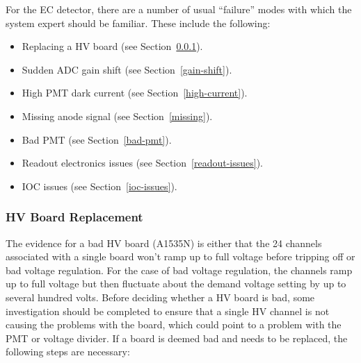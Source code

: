 \documentclass[letterpaper,10pt]{article}
\begin{document}
For the EC detector, there are a number of usual ``failure'' modes with which the system expert should
be familiar. These include the following:

\begin{itemize}
\item Replacing a HV board (see Section~\ref{board-swap}).
\item Sudden ADC gain shift (see Section~\ref{gain-shift}).
\item High PMT dark current (see Section~\ref{high-current}).
\item Missing anode signal (see Section~\ref{missing}).
\item Bad PMT (see Section~\ref{bad-pmt}).
\item Readout electronics issues (see Section~\ref{readout-issues}).
\item IOC issues (see Section~\ref{ioc-issues}).
\end{itemize}

\subsubsection{HV Board Replacement}
\label{board-swap}

The evidence for a bad HV board (A1535N) is either that the 24 channels associated with a single 
board won't ramp up to full voltage before tripping off or bad voltage regulation. For the case
of bad voltage regulation, the channels ramp up to full voltage but then fluctuate about the demand 
voltage setting by up to several hundred volts. Before deciding whether a HV board is bad, some
investigation should be completed to ensure that a single HV channel is not causing the problems
with the board, which could point to a problem with the PMT or voltage divider. If a board is deemed 
bad and needs to be replaced, the following steps are necessary:
\end{document}
